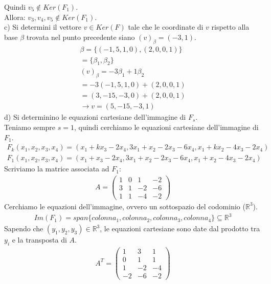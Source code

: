 \documentclass{article}
\begin{document}
Quindi $v_5 \notin Ker(F_1)$.
\\Allora: $v_3,v_4,v_5 \notin Ker(F_1)$.
\vspace{1em}
\\c) Si determini il vettore $v \in Ker (F)$ tale che le coordinate di $v$ rispetto alla base $\beta$ trovata nel punto precedente siano $(v)_\beta=(-3,1)$.
\begin{align*}
    \beta=\{(-1,5,1,0),(2,0,0,1)\}\\
    = \{\beta_1,\beta_2\} \\
    (v)_\beta=-3\beta_1+ 1\beta_2 \\
    = -3(-1,5,1,0)+ (2,0,0,1) \\
    = (3,-15,-3,0)+ (2,0,0,1) \\
    \to v= (5,-15,-3,1)
\end{align*}
d) Si determinino le equazioni cartesiane dell’immagine di $F_s$.
\\Teniamo sempre $s=1$, quindi cerchiamo le equazioni cartesiane dell'immagine di $F_1$.
\begin{align*}
    F_k(x_1,x_2,x_3,x_4)=(x_1+kx_3-2x_4, 3x_1+x_2-2x_3-6x_4, x_1+kx_2-4x_3-2x_4) \\
    F_1(x_1,x_2,x_3,x_4)=(x_1+x_3-2x_4, 3x_1+x_2-2x_3-6x_4, x_1+x_2-4x_3-2x_4)
\end{align*}
Scriviamo la matrice associata ad $F_1$:
\begin{align*}
    A=\begin{pmatrix}
        1 & 0 & 1 & -2 \\
        3 & 1 & -2 & -6 \\
        1 & 1 & -4 & -2
    \end{pmatrix}
\end{align*}
Cerchiamo le equazioni dell'immagine, ovvero un sottospazio del codominio ($\mathbb{R}^3$).
\begin{align*}
    Im(F_1)=span\{colonna_1,colonna_2,colonna_3,colonna_4\}\subseteq \mathbb{R}^3
\end{align*}
Sapendo che $(y_1,y_2,y_3) \in \mathbb{R}^3$, le equazioni cartesiane sono date dal prodotto tra  $y_i$ e la transposta di $A$.
\begin{align*}
    A^T=\begin{pmatrix}
        1 & 3 & 1\\
        0 & 1 & 1\\
        1 & -2 & -4 \\
        -2 & -6 & -2
    \end{pmatrix}
\end{align*}
\end{document}
